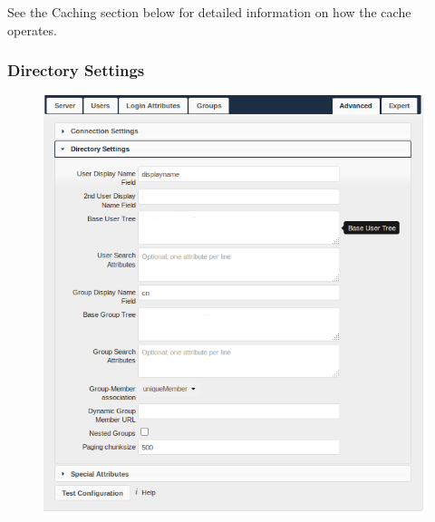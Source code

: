 \documentclass[letterpaper,10pt,english]{sphinxmanual}
\begin{document}
See the Caching section below for detailed information on how the cache
operates.


\subsubsection{Directory Settings}
\label{configuration_user/user_auth_ldap:ldap-directory-settings}\label{configuration_user/user_auth_ldap:directory-settings}\begin{figure}[htbp]
\centering

\includegraphics{ldap-advanced-2-directory.png}
\end{figure}
\end{document}

